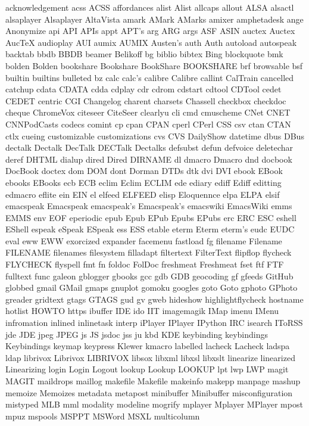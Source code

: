 acknowledgement
acss
ACSS
affordances
alist
Alist
allcaps
allout
ALSA
alsactl
alsaplayer
Alsaplayer
AltaVista
amark
AMark
AMarks
amixer
amphetadesk
ange
Anonymize
api
API
APIs
appt
APT's
arg
ARG
args
ASF
ASIN
auctex
Auctex
AucTeX
audioplay
AUI
aumix
AUMIX
Austen's
auth
Auth
autoload
autospeak
backtab
bbdb
BBDB
beamer
Belikoff
bg
biblio
bibtex
Bing
blockquote
bmk
bolden
Bolden
bookshare
Bookshare
BookShare
BOOKSHARE
brf
browsable
bsf
builtin
builtins
bulleted
bz
calc
calc's
calibre
Calibre
callint
CalTrain
cancelled
catchup
cdata
CDATA
cdda
cdplay
cdr
cdrom
cdstart
cdtool
CDTool
cedet
CEDET
centric
CGI
Changelog
charent
charsets
Chassell
checkbox
checkdoc
cheque
ChromeVox
citeseer
CiteSeer
clearlyu
cli
cmd
cmuscheme
CNet
CNET
CNNPodCasts
codecs
comint
cp
cpan
CPAN
cperl
CPerl
CSS
csv
ctan
CTAN
ctlx
cueing
customizable
customizations
cvs
CVS
DailyShow
datetime
dbus
DBus
dectalk
Dectalk
DecTalk
DECTalk
Dectalks
defsubst
defun
defvoice
deletechar
deref
DHTML
dialup
dired
Dired
DIRNAME
dl
dmacro
Dmacro
dnd
docbook
DocBook
doctex
dom
DOM
dont
Dorman
DTDs
dtk
dvi
DVI
ebook
EBook
ebooks
EBooks
ecb
ECB
eclim
Eclim
ECLIM
ede
ediary
ediff
Ediff
editting
edmacro
eflite
ein
EIN
el
elfeed
ELFEED
elisp
Eloquennce
elpa
ELPA
elsif
emacspeak
Emacspeak
emacspeak's
Emacspeak's
emacswiki
EmacsWiki
emms
EMMS
env
EOF
eperiodic
epub
Epub
EPub
Epubs
EPubs
erc
ERC
ESC
eshell
EShell
espeak
eSpeak
ESpeak
ess
ESS
etable
eterm
Eterm
eterm's
eudc
EUDC
eval
eww
EWW
exorcized
expander
facemenu
fastload
fg
filename
Filename
FILENAME
filenames
filesystem
filladapt
filtertext
FilterText
flipflop
flycheck
FLYCHECK
flyspell
fmt
fn
foldoc
FolDoc
freshmeat
Freshmeat
fset
ftf
FTF
fulltext
func
galeon
gblogger
gbooks
gcc
gdb
GDB
geocoding
gf
gfeeds
GitHub
globbed
gmail
GMail
gmaps
gnuplot
gomoku
googles
goto
Goto
gphoto
GPhoto
greader
gridtext
gtags
GTAGS
gud
gv
gweb
hideshow
highlightflycheck
hostname
hotlist
HOWTO
https
ibuffer
IDE
ido
IIT
imagemagik
IMap
imenu
IMenu
infromation
inlined
inlinetask
interp
iPlayer
IPlayer
IPython
IRC
isearch
IToRSS
jde
JDE
jpeg
JPEG
js
JS
jsdoc
jss
ju
kbd
KDE
keybinding
keybindings
Keybindings
keymap
keypress
Klewer
kmacro
labelled
lacheck
Lacheck
ladspa
ldap
librivox
Librivox
LIBRIVOX
libsox
libxml
libxsl
libxslt
linearize
linearized
Linearizing
login
Login
Logout
lookup
Lookup
LOOKUP
lpt
lwp
LWP
magit
MAGIT
maildrops
maillog
makefile
Makefile
makeinfo
makepp
manpage
mashup
memoize
Memoizes
metadata
metapost
minibuffer
Minibuffer
misconfiguration
mistyped
MLB
mml
modality
modeline
mogrify
mplayer
Mplayer
MPlayer
mpost
mpuz
mspools
MSPPT
MSWord
MSXL
multicolumn
